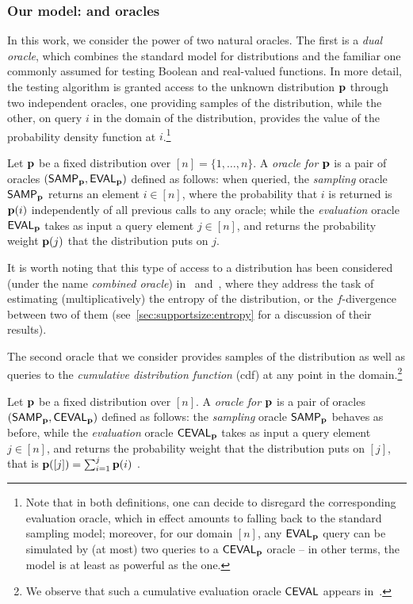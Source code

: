   \subsubsection{Our model: \pdfsamp and \cdfsamp oracles}  
  In this work, we consider the power of two natural oracles.
The first is a \emph{dual oracle}, which combines the standard model for distributions and the familiar one commonly assumed for testing Boolean and real-valued functions. In more detail, the testing algorithm is granted access to the unknown distribution $\mathbf{p}$ through two independent oracles, one providing samples of the distribution, while the other, on query $i$ in the domain of the distribution, provides the value of the probability
density function at $i$.\footnote{Note that in both definitions, one can decide to disregard the corresponding evaluation oracle, which in effect amounts to falling back to the standard sampling model; moreover, for our domain $[n]$, any ${\sf EVAL}_{\mathbf{p}}$ query can be simulated by (at most) two queries to a ${\sf CEVAL}_{\mathbf{p}}$ oracle -- in other terms, the \cdfsamp model is at least as powerful as the \pdfsamp one.}
    
    \begin{definition}
    Let $\mathbf{p}$ be a fixed distribution over $[n]=\{1,\dots,n\}$. A \emph{\pdfsamp oracle for $\mathbf{p}$} is a pair of oracles $({\sf SAMP}_{\mathbf{p}}, {\sf EVAL}_{\mathbf{p}})$ defined as follows: when queried, the \emph{sampling} oracle ${\sf SAMP}_{\mathbf{p}}$ returns an element $i\in[n]$, where the probability that $i$ is returned is $\mathbf{p}(i)$ independently of all previous calls to any oracle; while the \emph{evaluation} oracle ${\sf EVAL}_{\mathbf{p}}$ takes as input a query element $j\in[n]$, and returns the probability weight $\mathbf{p}(j)$ that the distribution puts on $j$.
    \end{definition}
    It is worth noting that this type of \pdfsamp access to a distribution has been considered (under the name \emph{combined oracle}) in~\cite{BDKR:05} and~\cite{GMV:06}, where they address the task of estimating (multiplicatively) the entropy of the distribution, or the $f$-divergence between two of them (see~\cref{sec:supportsize:entropy} for a discussion of their results).\medskip
    
    The second oracle that we consider provides samples of the distribution as well as queries to the \emph{cumulative distribution function} (cdf) at any point in the domain.\footnote{We observe that such a cumulative evaluation oracle ${\sf CEVAL}$ appears in~\cite[Section 8]{BKR:04}.}
    \begin{definition}
    Let $\mathbf{p}$ be a fixed distribution over $[n]$. A \emph{\cdfsamp oracle for $\mathbf{p}$} is a pair of oracles $({\sf SAMP}_{\mathbf{p}}, {\sf CEVAL}_{\mathbf{p}})$ defined as follows: the \emph{sampling} oracle ${\sf SAMP}_{\mathbf{p}}$ behaves as before, while the \emph{evaluation} oracle ${\sf CEVAL}_{\mathbf{p}}$ takes as input a query element $j\in[n]$, and returns the probability weight that the distribution puts on $[j]$, that is
    $\mathbf{p}([j])=\sum_{i=1}^j \mathbf{p}(i)$ .
    \end{definition}    
    
